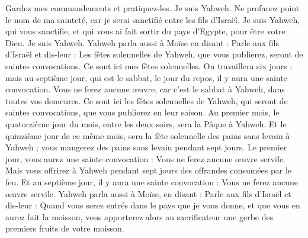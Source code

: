 \begin{multicols}{2}
Gardez mes commandements et pratiquez-les. Je suis Yahweh.
Ne profanez point le nom de ma sainteté, car je serai sanctifié entre les fils d'Israël. Je suis Yahweh, qui vous sanctifie,
et qui vous ai fait sortir du pays d'Egypte, pour être votre Dieu. Je suis Yahweh.
\VerseOne{}Yahweh parla aussi à Moïse en disant :
Parle aux fils d'Israël et dis-leur : Les fêtes solennelles de Yahweh, que vous publierez, seront de saintes convocations. Ce sont ici mes fêtes solennelles.
On travaillera six jours ; mais au septième jour, qui est le sabbat, le jour du repos, il y aura une sainte convocation. Vous ne ferez aucune œuvre, car c'est le sabbat à Yahweh, dans toutes vos demeures.
Ce sont ici les fêtes solennelles de Yahweh, qui seront de saintes convocations, que vous publierez en leur saison.
Au premier mois, le quatorzième jour du mois, entre les deux soirs, sera la Pâque à Yahweh.
Et le quinzième jour de ce même mois, sera la fête solennelle des pains sans levain à Yahweh ; vous mangerez des pains sans levain pendant sept jours.
Le premier jour, vous aurez une sainte convocation : Vous ne ferez aucune œuvre servile.
Mais vous offrirez à Yahweh pendant sept jours des offrandes consumées par le feu. Et au septième jour, il y aura une sainte convocation : Vous ne ferez aucune œuvre servile.
Yahweh parla aussi à Moïse, en disant :
Parle aux fils d'Israël et dis-leur : Quand vous serez entrés dans le pays que je vous donne, et que vous en aurez fait la moisson, vous apporterez alors au sacrificateur une gerbe des premiers fruits de votre moisson.

\end{multicols}
